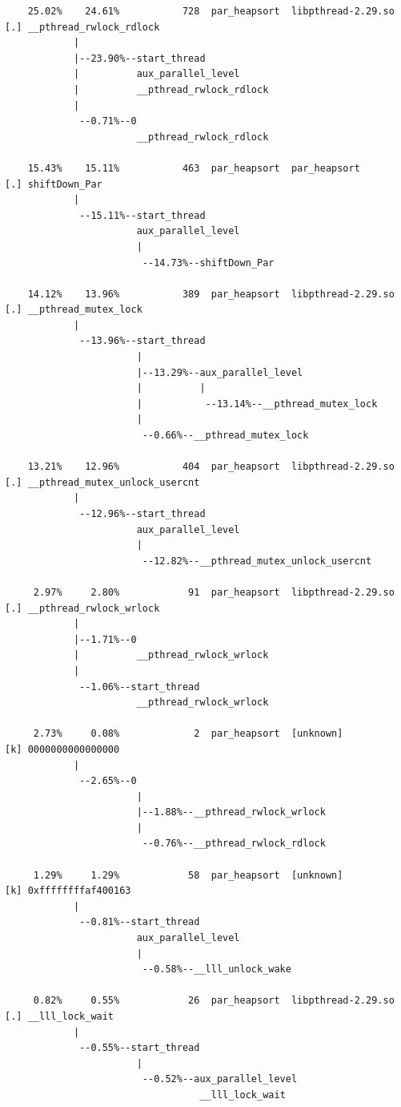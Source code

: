 \documentclass{article}
\begin{document}
\begin{verbatim}
    25.02%    24.61%           728  par_heapsort  libpthread-2.29.so  [.] __pthread_rwlock_rdlock
            |
            |--23.90%--start_thread
            |          aux_parallel_level
            |          __pthread_rwlock_rdlock
            |
             --0.71%--0
                       __pthread_rwlock_rdlock

    15.43%    15.11%           463  par_heapsort  par_heapsort        [.] shiftDown_Par
            |
             --15.11%--start_thread
                       aux_parallel_level
                       |
                        --14.73%--shiftDown_Par

    14.12%    13.96%           389  par_heapsort  libpthread-2.29.so  [.] __pthread_mutex_lock
            |
             --13.96%--start_thread
                       |
                       |--13.29%--aux_parallel_level
                       |          |
                       |           --13.14%--__pthread_mutex_lock
                       |
                        --0.66%--__pthread_mutex_lock

    13.21%    12.96%           404  par_heapsort  libpthread-2.29.so  [.] __pthread_mutex_unlock_usercnt
            |
             --12.96%--start_thread
                       aux_parallel_level
                       |
                        --12.82%--__pthread_mutex_unlock_usercnt

     2.97%     2.80%            91  par_heapsort  libpthread-2.29.so  [.] __pthread_rwlock_wrlock
            |
            |--1.71%--0
            |          __pthread_rwlock_wrlock
            |
             --1.06%--start_thread
                       __pthread_rwlock_wrlock

     2.73%     0.08%             2  par_heapsort  [unknown]           [k] 0000000000000000
            |
             --2.65%--0
                       |
                       |--1.88%--__pthread_rwlock_wrlock
                       |
                        --0.76%--__pthread_rwlock_rdlock

     1.29%     1.29%            58  par_heapsort  [unknown]           [k] 0xffffffffaf400163
            |
             --0.81%--start_thread
                       aux_parallel_level
                       |
                        --0.58%--__lll_unlock_wake

     0.82%     0.55%            26  par_heapsort  libpthread-2.29.so  [.] __lll_lock_wait
            |
             --0.55%--start_thread
                       |
                        --0.52%--aux_parallel_level
                                  __lll_lock_wait


\end{verbatim}
\end{document}
